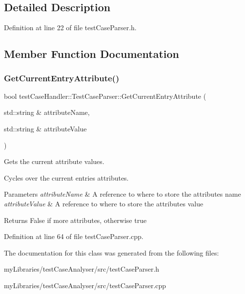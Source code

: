 \subsection{Detailed Description}


Definition at line 22 of file test\+Case\+Parser.\+h.



\subsection{Member Function Documentation}
\mbox{\label{classtestCaseHandler_1_1TestCaseParser_a7d868f50a4cc167300b5e68fd3b54a6d}} 
\subsubsection{\texorpdfstring{GetCurrentEntryAttribute()}{GetCurrentEntryAttribute()}}
{\footnotesize\ttfamily bool test\+Case\+Handler\+::\+Test\+Case\+Parser\+::\+Get\+Current\+Entry\+Attribute (\begin{DoxyParamCaption}\item[{std\+::string \&}]{attribute\+Name,  }\item[{std\+::string \&}]{attribute\+Value }\end{DoxyParamCaption})}



Gets the current attribute values. 

Cycles over the current entries attributes.


\begin{DoxyParams}{Parameters}
{\em attribute\+Name} & A reference to where to store the attribute\textquotesingle{}s name \\
\hline
{\em attribute\+Value} & A reference to where to store the attribute\textquotesingle{}s value \\
\hline
\end{DoxyParams}
\begin{DoxyReturn}{Returns}
False if more attributes, otherwise true 
\end{DoxyReturn}


Definition at line 64 of file test\+Case\+Parser.\+cpp.



The documentation for this class was generated from the following files\+:\begin{DoxyCompactItemize}
\item 
my\+Libraries/test\+Case\+Analyser/src/test\+Case\+Parser.\+h\item 
my\+Libraries/test\+Case\+Analyser/src/test\+Case\+Parser.\+cpp\end{DoxyCompactItemize}
